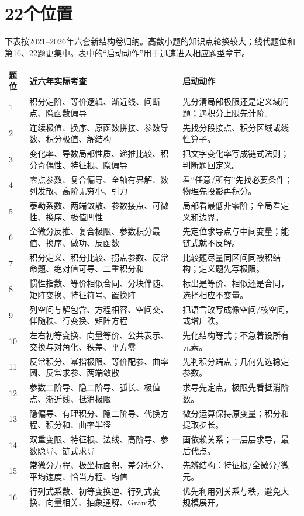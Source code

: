 \section{22个位置}
下表按2021--2026年六套新结构卷归纳。高数小题的知识点轮换较大；线代题位和第16、22题更集中。表中的“启动动作”用于迅速进入相应题型章节。
\small
\begin{longtable}{p{9mm}p{57mm}p{80mm}}
\toprule 题位&近六年实际考查&启动动作\\\midrule\endhead
1&积分定阶、等价逻辑、渐近线、间断点、隐函数偏导&先分清局部极限还是定义域问题；遇积分上限先计阶。\\
2&连续极值、换序、原函数拼接、参数导数、积分极值、解结构&先找分段接点、积分区域或线性算子。\\
3&变化率、导数局部性质、递推比较、积分奇偶性、特征根、隐偏导&把文字变化率写成链式法则；判断题回定义。\\
4&零点参数、复合偏导、全轴有界解、数列发散、高阶无穷小、引力&看“任意/所有”先找必要条件；物理先投影再积分。\\
5&泰勒系数、两端敛散、参数接点、可微性、换序、极值凹性&局部看最低非零阶；全局看定义和边界。\\
6&全微分反推、复合极限、参数积分最值、换序、做功、反函数&先定位求导点与中间变量；能链式就不反解。\\
7&积分定义、积分比较、拐点参数、反常命题、绝对值可导、二重积分和&比较题尽量同区间同被积结构；定义题先写极限。\\
8&惯性指数、等价相似合同、分块伴随、矩阵变换、特征符号、置换阵&标出是等价、相似还是合同，选择相应不变量。\\
9&列空间与解包含、方程相容、空间交、伴随秩、行变换、矩阵方程&把语言改写成像空间/核空间，或增广秩。\\
10&左右初等变换、向量等价、公共表示、交换与对角化、秩差、平方零&先化结构等式；不急着设所有元素。\\
11&反常积分、幂指极限、等价配参、曲率圆、反常求参、两端敛散&先判积分端点；几何先选稳定参数。\\
12&参数二阶导、隐二阶导、弧长、极值点、渐近线、抵消极限&求导先定点，极限先看抵消阶数。\\
13&隐偏导、有理积分、隐二阶导、代换方程、积分和、曲率半径&微分运算保持原变量；积分和提取步长。\\
14&双重变限、特征根、法线、高阶导、参数隐导、链式求导&画依赖关系；一层层求导，最后代点。\\
15&常微分方程、极坐标面积、差分积分、平均速度、恰当方程、均值&先辨结构：特征根/全微分/微元。\\
16&行列式系数、初等变换逆、行列式变换、向量相关、抽象通解、Gram秩&优先利用列关系与秩，避免大规模展开。\\

\end{longtable}

